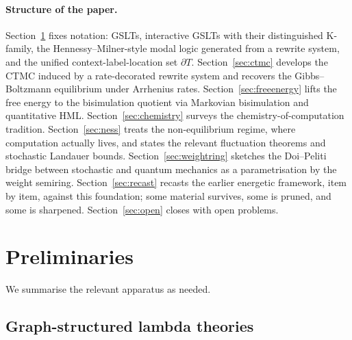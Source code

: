 \documentclass[11pt]{article}
\theoremstyle{plain}
\theoremstyle{definition}
\theoremstyle{remark}
\newcommand{\bd}{\partial}
\begin{document}
\paragraph{Structure of the paper.} Section~\ref{sec:prelim} fixes notation: GSLTs, interactive GSLTs with their distinguished K-family, the Hennessy--Milner-style modal logic generated from a rewrite system, and the unified context-label-location set $\bd T$. Section~\ref{sec:ctmc} develops the CTMC induced by a rate-decorated rewrite system and recovers the Gibbs--Boltzmann equilibrium under Arrhenius rates. Section~\ref{sec:freeenergy} lifts the free energy to the bisimulation quotient via Markovian bisimulation and quantitative HML. Section~\ref{sec:chemistry} surveys the chemistry-of-computation tradition. Section~\ref{sec:ness} treats the non-equilibrium regime, where computation actually lives, and states the relevant fluctuation theorems and stochastic Landauer bounds. Section~\ref{sec:weightring} sketches the Doi--Peliti bridge between stochastic and quantum mechanics as a parametrisation by the weight semiring. Section~\ref{sec:recast} recasts the earlier energetic framework, item by item, against this foundation; some material survives, some is pruned, and some is sharpened. Section~\ref{sec:open} closes with open problems.

\section{Preliminaries}\label{sec:prelim}

We summarise the relevant apparatus \cite{gslt-context,oslf-meredith} as needed.

\subsection{Graph-structured lambda theories}
\end{document}
